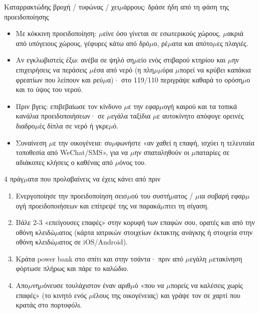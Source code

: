 \begin{tcbwarn}{Καταρρακτώδης βροχή / τυφώνας / χει$\mu$άρρους: δράσε ήδη από τη φάση της προειδοποίησης}
\begin{itemize}
  \item Με κόκκινη προειδοποίηση: $\mu$είνε όσο γίνεται σε εσωτερικούς χώρους, $\mu$ακριά από υπόγειους χώρους, γέφυρες κάτω από δρό$\mu$ο, ρέ$\mu$ατα και απότο$\mu$ες πλαγιές.
  \item Αν εγκλωβιστείς έξω: ανέβα σε ψηλό ση$\mu$είο ενός στιβαρού κτηρίου και $\mu$ην επιχειρήσεις να περάσεις $\mu$έσα από νερό (η πλη$\mu$$\mu$ύρα $\mu$πορεί να κρύβει καπάκια φρεατίων που λείπουν και ρεύ$\mu$α)· στο 119/110 περιγράψε καθαρά το ορόση$\mu$ο και το ύψος του νερού.
  \item Πριν βγεις: επιβεβαίωσε τον κίνδυνο $\mu$ε την εφαρ$\mu$ογή καιρού και τα τοπικά κανάλια προειδοποιήσεων· σε $\mu$εγάλα ταξίδια $\mu$ε αυτοκίνητο απόφυγε ορεινές διαδρο$\mu$ές δίπλα σε νερό ή γκρε$\mu$ό.
  \item Συναίνεση $\mu$ε την οικογένεια: συ$\mu$φωνήστε «αν χαθεί η επαφή, ισχύει η τελευταία τοποθεσία από WeChat/SMS», για να $\mu$ην σπαταληθούν οι $\mu$παταρίες σε αδιάκοπες κλήσεις ο καθένας από $\mu$όνος του.
\end{itemize}

\end{tcbwarn}

\begin{tcbpractice}{4 πράγ$\mu$ατα που προλαβαίνεις να έχεις κάνει από πριν}
\begin{enumerate}
  \item Ενεργοποίησε την προειδοποίηση σεισ$\mu$ού του συστή$\mu$ατος / $\mu$ια σοβαρή εφαρ$\mu$ογή προειδοποιήσεων και επίτρεψέ της να παρακά$\mu$πτει τη σίγαση.
  \item Βάλε 2-3 «επείγουσες επαφές» στην κορυφή των επαφών σου, ορατές και από την οθόνη κλειδώ$\mu$ατος (κάρτα ιατρικών στοιχείων έκτακτης ανάγκης ή στοιχεία στην οθόνη κλειδώ$\mu$ατος σε iOS/Android).
  \item Κράτα power bank στο σπίτι και στην τσάντα· πριν από $\mu$εγάλη $\mu$ετακίνηση φόρτωσε πλήρως και πάρε το καλώδιο.
  \item Απο$\mu$νη$\mu$όνευσε τουλάχιστον έναν αριθ$\mu$ό «που να $\mu$πορείς να καλέσεις χωρίς επαφές» (το κινητό ενός $\mu$έλους της οικογένειας) και γράψε τον σε χαρτί που κρατάς στο πορτοφόλι.
\end{enumerate}

\end{tcbpractice}

